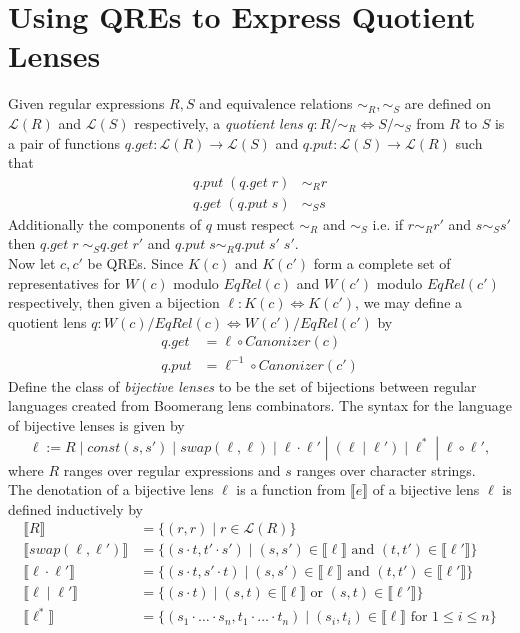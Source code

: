 \documentclass{svproc}
\newcommand{\sep}{\ensuremath{\; | \;}}
\begin{document}
\section{Using QREs to Express Quotient Lenses}
Given regular expressions $R, S$ and equivalence relations $\sim_R, \sim_S$ are
defined on $\mathcal{L}(R)$ and $\mathcal{L}(S)$ respectively, a
\textit{quotient lens} $q :
R/{\sim_R}{\Longleftrightarrow} S/{\sim_S}$ from $R$ to $S$ is
a pair of functions $q.get:
\mathcal{L}(R) \longrightarrow \mathcal{L}(S)$ and $q.put : \mathcal{L}(S)
\longrightarrow \mathcal{L}(R)$ such that
\begin{align*}
q.put \; (q.get \; r) &\sim_R r\\
q.get \; (q.put \; s) &\sim_S s
\end{align*}
Additionally the components of $q$ must respect $\sim_R$ and $\sim_S$ i.e.
if $r \sim_R r'$ and $s \sim_S s'$ then $q.get \; r \; \sim_S q.get \; r'$
and $q.put \; s \sim_R q.put \; s' \; s'$.\\
Now let $c, c'$ be QREs. Since $K(c)$ and $K(c')$ form a complete set of
representatives for $W(c)$ modulo $EqRel(c)$ and $W(c')$ modulo $EqRel(c')$
respectively, then given a bijection $\ell : K(c) \Leftrightarrow K(c')$, we
may define a quotient lens $q : W(c)/EqRel(c) \Leftrightarrow
W(c')/EqRel(c')$ by 
\begin{align*}
q.get &= \ell \circ Canonizer(c)\\
q.put &= \ell^{-1} \circ Canonizer(c')
\end{align*}
Define the class of \textit{bijective
lenses} to be the set of bijections between regular languages created from Boomerang lens combinators.
The syntax for the language of bijective lenses is given by
$$\ell := R \sep const(s, s') \sep  swap(\ell,
\ell) \sep \ell \cdot \ell' \; |  \; (\ell \sep \ell') \sep \ell^* \;
| \; \ell \circ \ell',$$ where $R$ ranges over regular expressions and $s$
ranges over character strings.\\
The denotation of a bijective lens $\ell$ is a function from 
$\llbracket e \rrbracket$ of a bijective lens $\ell$ is defined
inductively by
\begin{align*}
\llbracket R \rrbracket &= \{(r, r) \sep r \in \mathcal{L}(R)\}\\
\llbracket swap(\ell, \ell') \rrbracket &= \{(s \cdot t, t' \cdot s') \sep
(s, s') \in \llbracket \ell \rrbracket \text{ and } (t, t') \in \llbracket
\ell' \rrbracket\}\\
\llbracket \ell \cdot \ell' \rrbracket &= \{(s \cdot t, s' \cdot t) \sep
(s, s') \in \llbracket \ell \rrbracket \text{ and } (t, t') \in \llbracket
\ell' \rrbracket\}\\
\llbracket \ell \sep \ell' \rrbracket &= \{(s \cdot t) \sep
(s, t) \in \llbracket \ell \rrbracket \text{ or } (s, t) \in \llbracket
\ell' \rrbracket\}\\
\llbracket \ell^* \rrbracket &= \{(s_1 \cdot \ldots \cdot s_n, t_1 \cdot \ldots
\cdot t_n) \sep (s_i, t_i) \in \llbracket \ell \rrbracket \text{ for } 1
\leq i \leq n\}
\end{align*}
\end{document}
